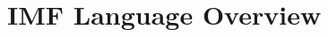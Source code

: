 \documentclass[./../../main]{subfiles}
\begin{document}
\chapter{IMF Language Overview}
\label{ch:IMFLanguageOverview}
\label{ch:IMF Language: Overview}
\label{ch:IMF visual language}

\end{document}
